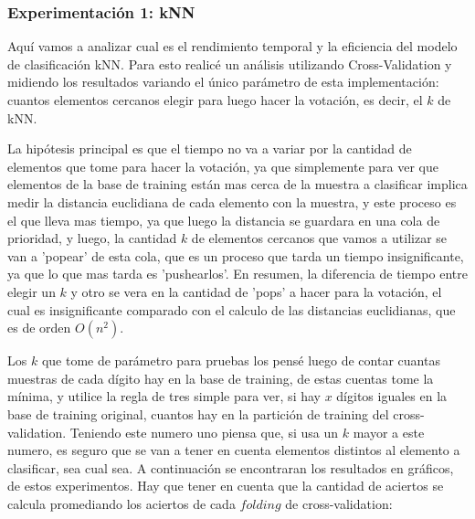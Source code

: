 \documentclass[a4paper]{article}
\begin{document}
\subsubsection{Experimentación 1: kNN}
Aquí vamos a analizar cual es el rendimiento temporal y la eficiencia del modelo de clasificación kNN. Para esto realicé un análisis utilizando Cross-Validation y midiendo los resultados variando el único parámetro de esta implementación: cuantos elementos cercanos elegir para luego hacer la votación, es decir, el $k$ de kNN.\par\smallbreak
La hipótesis principal es que el tiempo no va a variar por la cantidad de elementos que tome para hacer la votación, ya que simplemente para ver que elementos de la base de training están mas cerca de la muestra a clasificar implica medir la distancia euclidiana de cada elemento con la muestra, y este proceso es el que lleva mas tiempo, ya que luego la distancia se guardara en una cola de prioridad, y luego, la cantidad $k$ de elementos cercanos que vamos a utilizar se van a 'popear' de esta cola, que es un proceso que tarda un tiempo insignificante, ya que lo que mas tarda es 'pushearlos'. En resumen, la diferencia de tiempo entre elegir un $k$ y otro se vera en la cantidad de 'pops' a hacer para la votación, el cual es insignificante comparado con el calculo de las distancias euclidianas, que es de orden $O(n^2)$.\par
Los $k$ que tome de parámetro para pruebas los pensé luego de contar cuantas muestras de cada dígito hay en la base de training, de estas cuentas tome la mínima, y utilice la regla de tres simple para ver, si hay $x$ dígitos iguales en la base de training original, cuantos hay en la partición de training del cross-validation. Teniendo este numero uno piensa que, si usa un $k$ mayor a este numero, es seguro que se van a tener en cuenta elementos distintos al elemento a clasificar, sea cual sea.
A continuación se encontraran los resultados en gráficos, de estos experimentos. Hay que tener en cuenta que la cantidad de aciertos se calcula promediando los aciertos de cada $folding$ de cross-validation:
\end{document}
